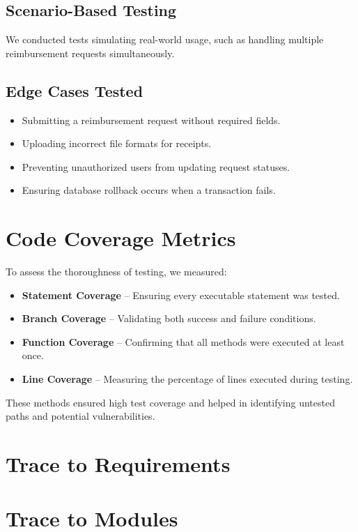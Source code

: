 \documentclass[12pt, titlepage]{article}
\begin{document}
\subsection*{Scenario-Based Testing}
We conducted tests simulating real-world usage, such as handling multiple reimbursement requests simultaneously.

\subsection*{Edge Cases Tested}
\begin{itemize}
    \item Submitting a reimbursement request without required fields.
    \item Uploading incorrect file formats for receipts.
    \item Preventing unauthorized users from updating request statuses.
    \item Ensuring database rollback occurs when a transaction fails.
\end{itemize}

\section*{Code Coverage Metrics}
To assess the thoroughness of testing, we measured:

\begin{itemize}
    \item \textbf{Statement Coverage} -- Ensuring every executable statement was tested.
    \item \textbf{Branch Coverage} -- Validating both success and failure conditions.
    \item \textbf{Function Coverage} -- Confirming that all methods were executed at least once.
    \item \textbf{Line Coverage} -- Measuring the percentage of lines executed during testing.
\end{itemize}

These methods ensured high test coverage and helped in identifying untested paths and potential vulnerabilities.

		
\section{Trace to Requirements}
		
\section{Trace to Modules}
\label{sec:TraceToModules}
\end{document}
